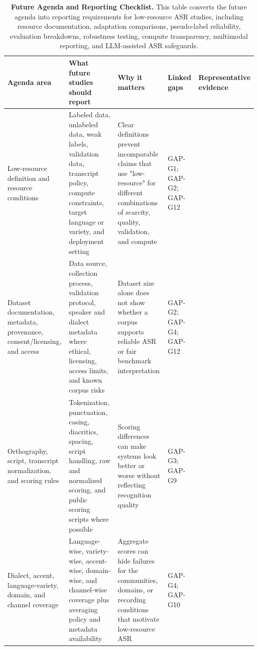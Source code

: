 \documentclass[pdflatex,sn-basic,iicol]{sn-jnl}
\theoremstyle{thmstyleone}
\theoremstyle{thmstyletwo}
\theoremstyle{thmstylethree}
\begin{document}
\begin{table}[htbp]
\setcounter{table}{5}
\small
\centering
\caption{\textbf{Future Agenda and Reporting Checklist.} This table converts the future agenda into reporting requirements for low-resource ASR studies, including resource documentation, adaptation comparisons, pseudo-label reliability, evaluation breakdowns, robustness testing, compute transparency, multimodal reporting, and LLM-assisted ASR safeguards.}
\label{tab:6}
\begin{tabularx}{\textwidth}{YYYYY}
\toprule
\textbf{Agenda area} & \textbf{What future studies should report} & \textbf{Why it matters} & \textbf{Linked gaps} & \textbf{Representative evidence} \\
\midrule
Low-resource definition and resource conditions & Labeled data, unlabeled data, weak labels, validation data, transcript policy, compute constraints, target language or variety, and deployment setting & Clear definitions prevent incomparable claims that use "low-resource" for different combinations of scarcity, quality, validation, and compute & GAP-G1; GAP-G2; GAP-G12 & \citep{besacier2014_underresourced_asr_survey,peterson2022_openasr21,chen2025mlsuperb2challenge} \\
Dataset documentation, metadata, provenance, consent/licensing, and access & Data source, collection process, validation protocol, speaker and dialect metadata where ethical, licensing, access limits, and known corpus risks & Dataset size alone does not show whether a corpus supports reliable ASR or fair benchmark interpretation & GAP-G2; GAP-G4; GAP-G12 & \citep{ardila2020commonvoice,lau2025_data_quality_multilingual_speech,gebru2021_datasheets_for_datasets,bender2018_data_statements} \\
Orthography, script, transcript normalization, and scoring rules & Tokenization, punctuation, casing, diacritics, spacing, script handling, raw and normalized scoring, and public scoring scripts where possible & Scoring differences can make systems look better or worse without reflecting recognition quality & GAP-G3; GAP-G9 & \citep{karita2023lenient,thennal2024cer,lau2025_data_quality_multilingual_speech} \\
Dialect, accent, language-variety, domain, and channel coverage & Language-wise, variety-wise, accent-wise, domain-wise, and channel-wise coverage plus averaging policy and metadata availability & Aggregate scores can hide failures for the communities, domains, or recording conditions that motivate low-resource ASR & GAP-G4; GAP-G10 & \citep{shi2023mlsuperb,chen2025mlsuperb2challenge,olatunji2023_afrispeech200,koenecke2020racialdisparities} \\

\end{tabularx}
\end{table}
\end{document}
